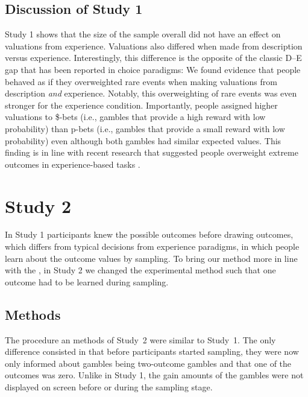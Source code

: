 \documentclass[a4paper, man, natbib, floatsintext]{apa6}
\begin{document}

\clearpage

\subsection{Discussion of Study 1}

Study 1 shows that the size of the sample overall did not have an effect on valuations from experience.  Valuations also differed when made from description versus experience. Interestingly, this difference is the opposite of the classic D--E gap that has been reported in choice paradigms: We found evidence that people behaved as if they overweighted rare events when making valuations from description \textit{and} experience. Notably, this overweighting of rare events was even stronger for the experience condition. Importantly, people assigned higher valuations to \$-bets (i.e., gambles that provide a high reward with low probability) than p-bets (i.e., gambles that provide a small reward with low probability) even although both gambles had similar expected values. This finding is in line with recent research that suggested people overweight extreme outcomes in experience-based tasks \citep{Ludvig2017}.

\section{Study 2}
In Study 1 participants knew the possible outcomes before drawing outcomes, which differs from typical decisions from experience paradigms, in which people learn about the outcome values by sampling. To bring our method more in line with the , in Study 2 we changed the experimental method such that one outcome had to be learned during sampling.

\subsection{Methods}
The procedure an methods of Study~2 were similar to Study~1. The only difference consisted in that before participants started sampling, they were now only informed about gambles being two-outcome gambles and that one of the outcomes was zero. Unlike in Study 1, the gain amounts of the gambles were not displayed on screen before or during the sampling stage.
\end{document}
